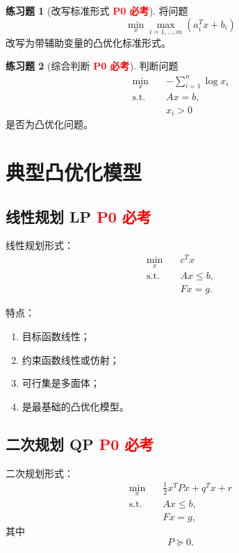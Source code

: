 \documentclass[11pt,a4paper]{ctexart}
\newcommand{\st}{\text{s.t.}}
\newcommand{\Pzero}{\textcolor{red}{\textbf{P0 必考}}}
\theoremstyle{definition}
\newtheorem{exercise}{练习题}[section]
\theoremstyle{plain}
\theoremstyle{remark}
\begin{document}
\begin{exercise}[改写标准形式 \Pzero]
将问题
\[
    \min_x \max_{i=1,\dots,m}(a_i^Tx+b_i)
\]
改写为带辅助变量的凸优化标准形式。
\end{exercise}

\begin{exercise}[综合判断 \Pzero]
判断问题
\[
\begin{aligned}
    \min_x\quad & -\sum_{i=1}^n \log x_i\\
    \st\quad & Ax=b,\\
    & x_i>0
\end{aligned}
\]
是否为凸优化问题。
\end{exercise}

\newpage

\section{典型凸优化模型}

\subsection{线性规划 LP \Pzero}

线性规划形式：
\[
\begin{aligned}
    \min_x\quad & c^Tx\\
    \st\quad & Ax\le b,\\
    & Fx=g.
\end{aligned}
\]

特点：

\begin{enumerate}[label=\arabic*.]
    \item 目标函数线性；
    \item 约束函数线性或仿射；
    \item 可行集是多面体；
    \item 是最基础的凸优化模型。
\end{enumerate}

\subsection{二次规划 QP \Pzero}

二次规划形式：
\[
\begin{aligned}
    \min_x\quad &
    \frac12 x^TPx+q^Tx+r\\
    \st\quad & Ax\le b,\\
    & Fx=g,
\end{aligned}
\]
其中
\[
    P\succeq0.
\]
\end{document}
